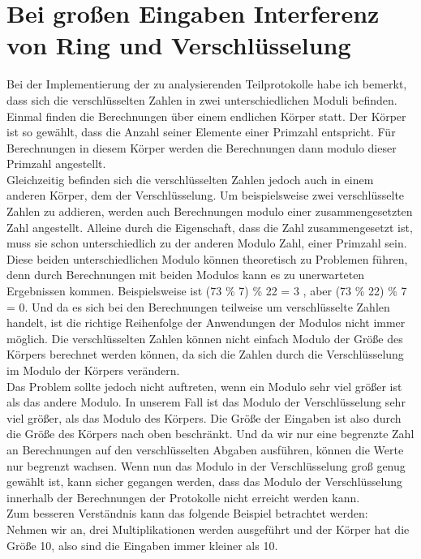 \section{Bei großen Eingaben Interferenz von Ring und Verschlüsselung}
Bei der Implementierung der zu analysierenden Teilprotokolle habe ich bemerkt, dass sich die verschlüsselten Zahlen in zwei unterschiedlichen Moduli befinden. Einmal finden die Berechnungen über einem endlichen Körper statt. Der Körper ist so gewählt, dass die Anzahl seiner Elemente einer Primzahl entspricht. Für Berechnungen in diesem Körper werden die Berechnungen dann modulo dieser Primzahl angestellt.\\
Gleichzeitig befinden sich die verschlüsselten Zahlen jedoch auch in einem anderen Körper, dem der Verschlüsselung. Um beispielsweise zwei verschlüsselte Zahlen zu addieren, werden auch Berechnungen modulo einer zusammengesetzten Zahl angestellt. Alleine durch die Eigenschaft, dass die Zahl zusammengesetzt ist, muss sie schon unterschiedlich zu der anderen Modulo Zahl, einer Primzahl sein.\\
Diese beiden unterschiedlichen Modulo können theoretisch zu Problemen führen, denn durch Berechnungen mit beiden Modulos kann es zu unerwarteten Ergebnissen kommen.
Beispielsweise ist (73 \% 7) \% 22  = 3 , aber (73 \% 22) \% 7 = 0. Und da es sich bei den Berechnungen teilweise um verschlüsselte Zahlen handelt, ist die richtige Reihenfolge der Anwendungen der Modulos nicht immer möglich. Die verschlüsselten Zahlen können nicht einfach Modulo der Größe des Körpers berechnet werden können, da sich die Zahlen durch die Verschlüsselung im Modulo der Körpers verändern.\\
Das Problem sollte jedoch nicht auftreten, wenn ein Modulo sehr viel größer ist als das andere Modulo. In unserem Fall ist das Modulo der Verschlüsselung sehr viel größer, als das Modulo des Körpers. Die Größe der Eingaben ist also durch die Größe des Körpers nach oben beschränkt. Und da wir nur eine begrenzte Zahl an Berechnungen auf den verschlüsselten Abgaben ausführen, können die Werte nur begrenzt wachsen. Wenn nun das Modulo in der Verschlüsselung groß genug gewählt ist, kann sicher gegangen werden, dass das Modulo der Verschlüsselung innerhalb der Berechnungen der Protokolle nicht erreicht werden kann.\\
Zum besseren Verständnis kann das folgende Beispiel betrachtet werden:\\
Nehmen wir an, drei Multiplikationen werden ausgeführt und der Körper hat die Größe 10, also sind die Eingaben immer kleiner als 10.\\
